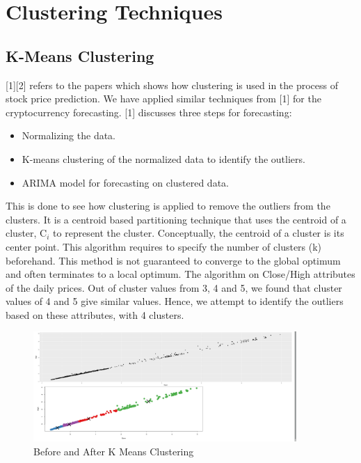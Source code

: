 \documentclass{article}
\begin{document}
\section{Clustering Techniques}
\subsection{K-Means Clustering}
[1][2] refers to the papers which shows how clustering is used in the process of stock price prediction. We have applied similar techniques from [1] for the cryptocurrency forecasting. [1] discusses three steps for forecasting:
\begin{itemize}
	\item Normalizing the data.
	\item K-means clustering of the normalized data to identify the outliers.
	\item ARIMA model for forecasting on clustered data.
\end{itemize}
This is done to see how clustering is applied to remove the outliers from the clusters.
It is a centroid based partitioning technique that uses the centroid of a cluster, C$_{i}$ to represent the cluster. Conceptually, the centroid of a cluster is its center point. This algorithm requires to specify the number of clusters (k) beforehand. This method is not guaranteed to converge to the global optimum and often terminates to a local optimum.
The algorithm on Close/High attributes of the daily prices. Out of cluster values from 3, 4 and 5, we found that cluster values of 4 and 5 give similar values. Hence, we attempt to identify the outliers based on these attributes, with 4 clusters.

\begin{figure}[ht]
	\centering
	\includegraphics[width= 10cm]{KMeansClustering.png}
	\caption{Before and After K Means Clustering}
	\label{fig:kmeansclustering}
\end{figure}
\end{document}
